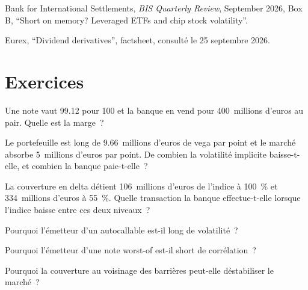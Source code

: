 \begin{omsources}
\item Bank for International Settlements, \emph{BIS Quarterly Review}, September 2026, Box B, ``Short on memory? Leveraged ETFs and chip stock
volatility''.
\item Eurex, ``Dividend derivatives'', factsheet, consulté le 25 septembre 2026.
\end{omsources}

\section{Exercices}

\begin{exercise}[$\star$]\label{exo:s2:hedging-a-structured-products-book:1}
Une note vaut 99.12 pour 100 et la banque en vend pour 400~millions d'euros au pair. Quelle est la marge~?
\end{exercise}

\begin{exercise}[$\star$]\label{exo:s2:hedging-a-structured-products-book:2}
Le portefeuille est long de 9.66~millions d'euros de vega par point et le marché absorbe 5~millions d'euros par point. De combien la volatilité implicite baisse-t-elle, et
combien la banque paie-t-elle~?
\end{exercise}

\begin{exercise}[$\star$]\label{exo:s2:hedging-a-structured-products-book:3}
La couverture en delta détient 106~millions d'euros de l'indice à 100~\% et 334~millions d'euros à 55~\%. Quelle transaction la banque effectue-t-elle lorsque l'indice baisse entre ces deux niveaux~?
\end{exercise}

\begin{exercise}[$\star\star$]\label{exo:s2:hedging-a-structured-products-book:4}
Pourquoi l'émetteur d'un autocallable est-il long de volatilité~?
\end{exercise}

\begin{exercise}[$\star\star$]\label{exo:s2:hedging-a-structured-products-book:5}
Pourquoi l'émetteur d'une note worst-of est-il short de corrélation~?
\end{exercise}

\begin{exercise}[$\star\star$]\label{exo:s2:hedging-a-structured-products-book:6}
Pourquoi la couverture au voisinage des barrières peut-elle déstabiliser le marché~?
\end{exercise}

